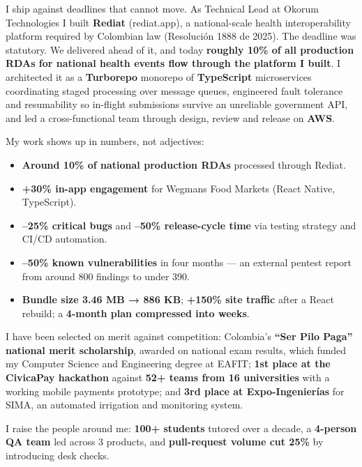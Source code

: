 \documentclass[11pt,a4paper]{awesome-cv}
\begin{document}
\begin{cvletter}
I ship against deadlines that cannot move. As Technical Lead at Okorum Technologies I built \textbf{Rediat} (rediat.app), a national-scale health interoperability platform required by Colombian law (Resolución 1888 de 2025). The deadline was statutory. We delivered ahead of it, and today \textbf{roughly 10\% of all production RDAs for national health events flow through the platform I built}. I architected it as a \textbf{Turborepo} monorepo of \textbf{TypeScript} microservices coordinating staged processing over message queues, engineered fault tolerance and resumability so in-flight submissions survive an unreliable government API, and led a cross-functional team through design, review and release on \textbf{AWS}.

My work shows up in numbers, not adjectives:

\begin{itemize}[leftmargin=3ex, nosep, noitemsep]
  \item \textbf{Around 10\% of national production RDAs} processed through Rediat.
  \item \textbf{+30\% in-app engagement} for Wegmans Food Markets (React Native, TypeScript).
  \item \textbf{--25\% critical bugs} and \textbf{--50\% release-cycle time} via testing strategy and CI/CD automation.
  \item \textbf{--50\% known vulnerabilities} in four months --- an external pentest report from around 800 findings to under 390.
  \item \textbf{Bundle size 3.46 MB → 886 KB}; \textbf{+150\% site traffic} after a React rebuild; a \textbf{4-month plan compressed into weeks}.
\end{itemize}

I have been selected on merit against competition: Colombia's \textbf{``Ser Pilo Paga'' national merit scholarship}, awarded on national exam results, which funded my Computer Science and Engineering degree at EAFIT; \textbf{1st place at the CivicaPay hackathon} against \textbf{52+ teams from 16 universities} with a working mobile payments prototype; and \textbf{3rd place at Expo-Ingenierías} for SIMA, an automated irrigation and monitoring system.

I raise the people around me: \textbf{100+ students} tutored over a decade, a \textbf{4-person QA team} led across 3 products, and \textbf{pull-request volume cut 25\%} by introducing desk checks.

\end{cvletter}

\makeletterclosing
\end{document}
